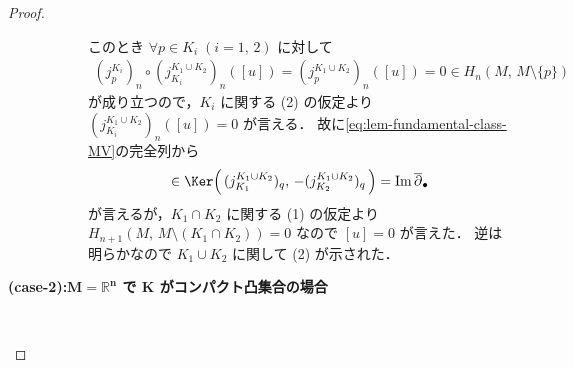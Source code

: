 \documentclass[algtopo_main]{subfiles}
\begin{document}
\begin{proof}
\begin{description}
\begin{description}
            このとき $\forall p \in K_i\; (i=1,\, 2)$  に対して
            \begin{align}
                (j_{p}^{K_i})_n \circ (j_{K_i}^{K_1 \cup K_2})_n ([u]) = (j_p^{K_1 \cup K_2})_n ([u]) = 0 \in H_n(M,\, M \setminus \{p\})
            \end{align}
            が成り立つので，$K_i$ に関する (2) の仮定より $(j_{K_i}^{K_1 \cup K_2})_n ([u]) = 0$ が言える．
            故に\eqref{eq:lem-fundamental-class-MV}の完全列から
            \begin{align}
                [u] \in \Ker \Bigl(\, (j_{K_1}^{K_1 \cup K_2})_q,\, -(j_{K_2}^{K_1 \cup K_2})_q\,\Bigr) = \Im \overline{\partial}_\bullet
            \end{align}
            が言えるが，$K_1 \cap K_2$ に関する (1) の仮定より $H_{n+1} (M,\, M \setminus (K_1\cap K_2)) = 0$ なので $[u] = 0$ が言えた．
            逆は明らかなので $K_1 \cup K_2$ に関して (2) が示された．
        \end{description}
        
        \item[\textbf{(case-2):$\bm{M = \mathbb{R}^n}$ で $\bm{K}$ がコンパクト凸集合の場合}]　
        

\end{description}
\end{proof}
\end{document}
